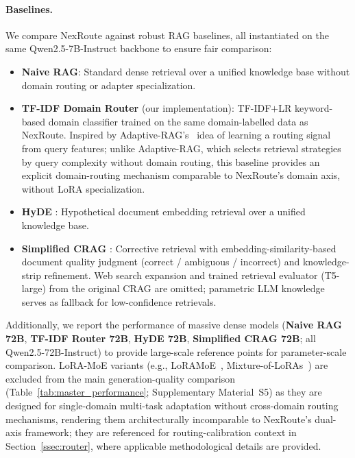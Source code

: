 \documentclass[a4paper,fleql]{cas-sc}
\begin{document}
\paragraph{Baselines.}
We compare NexRoute against robust RAG baselines, all instantiated on the same
Qwen2.5-7B-Instruct backbone to ensure fair comparison:
\begin{itemize}
    \item \textbf{Naive RAG}: Standard dense retrieval over a unified knowledge
    base without domain routing or adapter specialization.

    \item \textbf{TF-IDF Domain Router} (our implementation): TF-IDF$+$LR
    keyword-based domain classifier trained on the same domain-labelled data as
    NexRoute. Inspired by Adaptive-RAG's~\citep{jeong2024adaptiverag} idea of
    learning a routing signal from query features; unlike Adaptive-RAG, which
    selects retrieval strategies by query complexity without domain routing,
    this baseline provides an explicit domain-routing mechanism comparable to
    NexRoute's domain axis, without LoRA specialization.

    \item \textbf{HyDE} \citep{gao2023hyde}: Hypothetical document embedding
    retrieval over a unified knowledge base.

    \item \textbf{Simplified CRAG} \citep{yan2024crag}: Corrective retrieval
    with embedding-similarity-based document quality judgment
    (correct / ambiguous / incorrect) and knowledge-strip refinement. Web
    search expansion and trained retrieval evaluator (T5-large) from the
    original CRAG are omitted; parametric LLM knowledge serves as fallback
    for low-confidence retrievals.
\end{itemize}
Additionally, we report the performance of massive dense models
(\textbf{Naive RAG 72B}, \textbf{TF-IDF Router 72B}, \textbf{HyDE 72B},
\textbf{Simplified CRAG 72B}; all Qwen2.5-72B-Instruct) to provide large-scale
reference points for parameter-scale comparison. LoRA-MoE variants
(e.g., LoRAMoE~\citep{dou2024loramoe}, Mixture-of-LoRAs~\citep{wu2024mixtureofloras})
are excluded from the main generation-quality comparison
(Table~\ref{tab:master_performance}; Supplementary Material~S5) as they are
designed for single-domain multi-task adaptation without cross-domain routing
mechanisms, rendering them architecturally incomparable to NexRoute's dual-axis
framework; they are referenced for routing-calibration context in
Section~\ref{ssec:router}, where applicable methodological details are provided.
\end{document}
